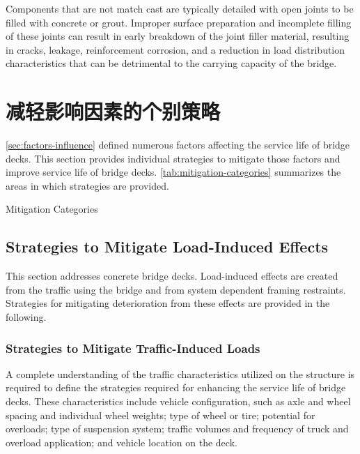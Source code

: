 Components that are not match cast are typically detailed with open joints to be filled with concrete or grout.
Improper surface preparation and incomplete filling of these joints can result in early breakdown of the joint filler
material, resulting in cracks, leakage, reinforcement corrosion, and a reduction in load distribution characteristics that
can be detrimental to the carrying capacity of the bridge.

\section{减轻影响因素的个别策略}
\label{sec:individual-strategy}
\cref{sec:factors-influence} defined numerous factors affecting the service life of bridge decks. This section provides individual strategies to mitigate those factors and improve service life of bridge decks. \cref{tab:mitigation-categories} summarizes the areas in which strategies are provided.

\begin{table}
  \caption{Mitigation Categories}
  \label{tab:mitigation-categories}
  
\end{table}

\subsection{Strategies to Mitigate Load-Induced Effects}
\label{subsec:strategies-mitigate-load-induced}
This section addresses concrete bridge decks. Load-induced effects are created from the traffic using the bridge
and from system dependent framing restraints. Strategies for mitigating deterioration from these effects are provided
in the following.

\subsubsection*{Strategies to Mitigate Traffic-Induced Loads}
A complete understanding of the traffic characteristics utilized on the structure is required to define the strategies
required for enhancing the service life of bridge decks. These characteristics include vehicle configuration, such as
axle and wheel spacing and individual wheel weights; type of wheel or tire; potential for overloads; type of
suspension system; traffic volumes and frequency of truck and overload application; and vehicle location on the
deck.

